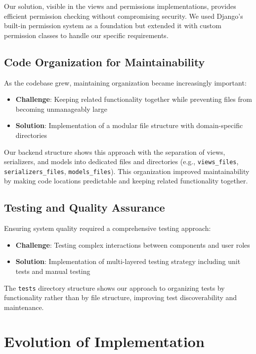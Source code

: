Our solution, visible in the views and permissions implementations, provides efficient permission checking without compromising security. We used Django's built-in permission system as a foundation but extended it with custom permission classes to handle our specific requirements.

\subsection{Code Organization for Maintainability}

As the codebase grew, maintaining organization became increasingly important:

\begin{itemize}
    \item \textbf{Challenge}: Keeping related functionality together while preventing files from becoming unmanageably large
    \item \textbf{Solution}: Implementation of a modular file structure with domain-specific directories
\end{itemize}

Our backend structure shows this approach with the separation of views, serializers, and models into dedicated files and directories (e.g., \texttt{views\_files}, \texttt{serializers\_files}, \texttt{models\_files}). This organization improved maintainability by making code locations predictable and keeping related functionality together.

\subsection{Testing and Quality Assurance}

Ensuring system quality required a comprehensive testing approach:

\begin{itemize}
    \item \textbf{Challenge}: Testing complex interactions between components and user roles
    \item \textbf{Solution}: Implementation of multi-layered testing strategy including unit tests and manual testing
\end{itemize}

The \texttt{tests} directory structure shows our approach to organizing tests by functionality rather than by file structure, improving test discoverability and maintenance.

\section{Evolution of Implementation}

